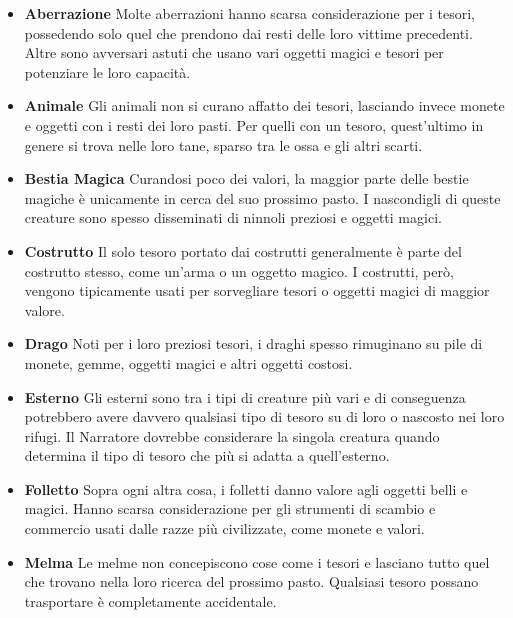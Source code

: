 \documentclass[12pt,a4paper,twoside,openany]{book}
\begin{document}
\begin{multicols}{2}
\begin{itemize}

\item \textbf{Aberrazione}
Molte aberrazioni hanno scarsa considerazione per i tesori, possedendo solo quel che prendono dai resti delle loro vittime precedenti. Altre sono avversari astuti che usano vari oggetti magici e tesori per potenziare le loro capacità.

\item \textbf{Animale}
Gli animali non si curano affatto dei tesori, lasciando invece monete e oggetti con i resti dei loro pasti. Per quelli con un tesoro, quest'ultimo in genere si trova nelle loro tane, sparso tra le ossa e gli altri scarti.

\item \textbf{Bestia Magica}
Curandosi poco dei valori, la maggior parte delle bestie magiche è unicamente in cerca del suo prossimo pasto. I nascondigli di queste creature sono spesso disseminati di ninnoli preziosi e oggetti magici.

\item \textbf{Costrutto}
Il solo tesoro portato dai costrutti generalmente è parte del costrutto stesso, come un'arma o un oggetto magico. I costrutti, però, vengono tipicamente usati per sorvegliare tesori o oggetti magici di maggior valore.

\item \textbf{Drago}
Noti per i loro preziosi tesori, i draghi spesso rimuginano su pile di monete, gemme, oggetti magici e altri oggetti costosi.

\item \textbf{Esterno}
Gli esterni sono tra i tipi di creature più vari e di conseguenza potrebbero avere davvero qualsiasi tipo di tesoro su di loro o nascosto nei loro rifugi. Il Narratore dovrebbe considerare la singola creatura quando determina il tipo di tesoro che più si adatta a quell'esterno.

\item \textbf{Folletto}
Sopra ogni altra cosa, i folletti danno valore agli oggetti belli e magici. Hanno scarsa considerazione per gli strumenti di scambio e commercio usati dalle razze più civilizzate, come monete e valori.

\item \textbf{Melma}
Le melme non concepiscono cose come i tesori e lasciano tutto quel che trovano nella loro ricerca del prossimo pasto. Qualsiasi tesoro possano trasportare è completamente accidentale.


\end{itemize}
\end{multicols}
\end{document}
